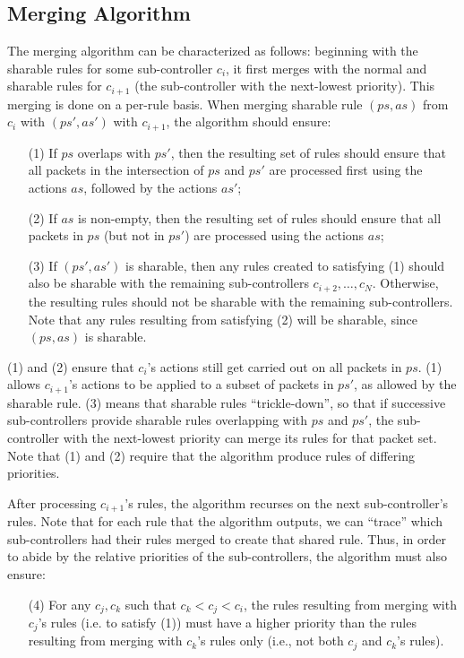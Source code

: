 \documentclass{article}
\begin{document}
\subsection{Merging Algorithm} \label{ALGO}

The merging algorithm can be characterized as follows: beginning with the
sharable rules for some sub-controller $c_i$, it first merges with the
normal and sharable rules for $c_{i+1}$ 
(the sub-controller with the next-lowest priority). 
This merging is done on a per-rule basis.
When merging sharable rule $(ps, as)$ from $c_i$ with $(ps', as')$ with
$c_{i+1}$, the algorithm should ensure:
\begin{itemize}
\item[(1)] If $ps$ overlaps with $ps'$, then the resulting set of rules
should ensure that all packets in the intersection of $ps$ and $ps'$ are
processed first using the actions $as$, followed by the actions $as'$;
\item[(2)] If $as$ is non-empty, then the resulting set of rules
should ensure that all packets in $ps$ (but not in $ps'$) are processed using 
the actions $as$;  
\item[(3)] If $(ps', as')$ is sharable, then any rules created to 
satisfying (1) should also be sharable 
with the remaining sub-controllers $c_{i+2}, \dots, c_{N}$.
Otherwise, the resulting rules should not be sharable with the remaining
sub-controllers.
Note that any rules resulting from satisfying (2) will be sharable, since
$(ps, as)$ is sharable.
\end{itemize}
(1) and (2) ensure that $c_i$'s actions still get carried out on all
packets in $ps$. (1) allows $c_{i+1}$'s actions to be applied to 
a subset of packets in $ps'$, as allowed by the sharable rule.
(3) means that sharable rules ``trickle-down'', so that if successive
sub-controllers provide sharable rules overlapping with $ps$ and $ps'$, 
the sub-controller with the next-lowest priority can merge its rules for 
that packet set.
Note that (1) and (2) require that the algorithm produce rules of differing
priorities.

After processing $c_{i+1}$'s rules,
the algorithm recurses on the next sub-controller's rules.
Note that for each rule that the algorithm outputs, we can ``trace''
which sub-controllers had their rules merged to create that shared rule.
Thus, in order to abide by the relative priorities of the sub-controllers, 
the algorithm must also ensure:
\begin{itemize}
\item[(4)] For any $c_j, c_k$ such that $c_k < c_j < c_i$, 
the rules resulting from merging with $c_j$'s rules (i.e. to satisfy (1)) 
must have a higher priority than the rules resulting from merging 
with $c_k$'s rules only (i.e., not both $c_j$ and $c_k$'s rules).
\end{itemize}
\end{document}

